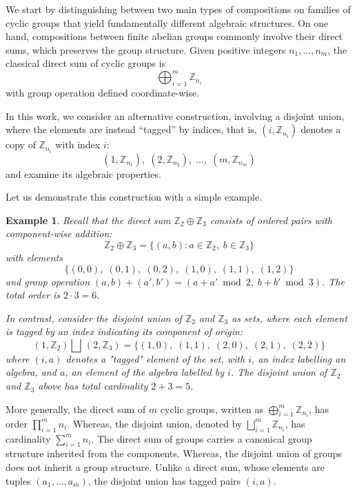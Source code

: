 \documentclass[a4paper,12pt]{article}
\newtheorem{example}{Example}[section]
\newcommand{\Z}{\mathbb{Z}}
\begin{document}
We start by distinguishing between two main types of compositions on families of cyclic groups that yield fundamentally different algebraic structures. 
On one hand, compositions between finite abelian groups commonly involve  their direct sums, which preserves the group structure.  Given positive integers $n_1, \ldots, n_m$, the classical direct sum of cyclic groups is
\[
  \bigoplus_{i=1}^{m} \Z_{n_i}  
\]
with group operation defined coordinate-wise. 

In this work, we consider
an alternative construction, involving a disjoint union, where the elements are instead  ``tagged'' by indices, that is,  $(i, \Z_{n_i})$ denotes a copy of $\Z_{n_i}$ with index $i$:    
\[
  (1,\Z_{n_1}),\; (2,\Z_{n_2}),\; \ldots,\; (m,\Z_{n_m})  
\]
and examine its algebraic properties.

Let us demonstrate this construction with a simple example. 
\begin{example}
Recall that the direct sum $\Z_2 \oplus \Z_3$ consists of ordered pairs
with component-wise addition:
\[
  \Z_2 \oplus \Z_3 = \{(a,b) : a \in \Z_2,\; b \in \Z_3\}
\]
with elements
\[
  \{(0,0),\; (0,1),\; (0,2),\; (1,0),\; (1,1),\; (1,2)\}
\]
and group operation
$(a,b) + (a',b') = (a + a' \bmod 2,\; b + b' \bmod 3)$.
The total order is $2 \cdot 3 = 6$. 

In contrast, consider the disjoint union of $\Z_2$ and $\Z_3$ as sets,
where each element is tagged by an index indicating its component of
origin:    
\[
  (1,\Z_2) \bigsqcup \, (2,\Z_3) = \{(1,0),\;(1,1),\;(2,0),\;(2,1),\;(2,2)\} 
\]
where $(i, a)$ denotes a "tagged" element of the set, with $i$, an index labelling an algebra, and $a$, an element of the algebra labelled by $i$.  The disjoint union of $\Z_2$ and $\Z_3$ above has total cardinality $2 + 3 = 5$.

\end{example}

More generally, the direct sum of $m$ cyclic groups, written as     
$\bigoplus_{i=1}^{m} \Z_{n_i}$, has order $\prod_{i=1}^{m} n_i$.  Whereas, the disjoint union, denoted by  $\bigsqcup_{i=1}^{m} \Z_{n_i}$, has cardinality $\sum_{i=1}^{m} n_i$.  The direct sum of groups carries a canonical group structure inherited from the components. Whereas,  the disjoint union of groups  does not inherit a group structure. Unlike a direct sum, whose elements are tuples $(a_1,\ldots,a_m)$, the disjoint union has tagged pairs $(i,a)$.  
 
\end{document}
